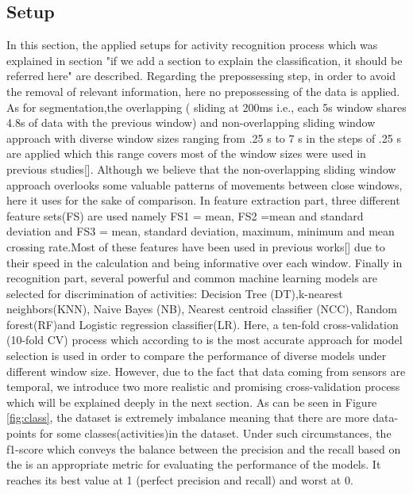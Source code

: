 \subsection{Setup}
In this section, the applied setups for activity recognition process which was explained in section {"if we add a section to explain the classification, it should be referred here"} are described. Regarding the prepossessing step, in order to avoid the removal of relevant information, here no prepossessing of the data is applied. As for segmentation,the overlapping (  sliding at 200ms i.e., each 5s window
shares 4.8s of data with the previous window) \cite{morris2014recofit} and non-overlapping \cite{banos2014window} sliding window approach with diverse window sizes ranging from .25 s to 7 s in the steps of .25 s are applied which this range covers most of the window sizes were used in previous studies[]. Although we believe that the non-overlapping sliding window approach overlooks some valuable patterns of movements between close windows, here it uses for the sake of comparison. 
In feature extraction part, three different feature sets(FS) are used namely FS1 = {mean}, FS2 ={mean and standard deviation} and FS3 = {mean, standard deviation, maximum, minimum and mean crossing rate}.Most of these features have been used in previous works[] due to their speed in the calculation and being informative over each window. Finally in recognition part, several powerful and common machine learning models are selected for discrimination of activities: Decision Tree (DT),k-nearest neighbors(KNN), Naive Bayes (NB), Nearest centroid classifier (NCC), Random forest(RF)and Logistic regression classifier(LR).\newline
Here, a ten-fold cross-validation (10-fold CV) process which according to \cite{arlot2010survey} is the most accurate approach for model selection is used in order to compare the performance of diverse models under different window size. However, due to the fact that data coming from sensors are temporal, we introduce two more realistic and promising cross-validation process which will be explained deeply in the next section.\newline
As can be seen in Figure \ref{fig:class}, the dataset is extremely imbalance meaning that there are more data-points for some classes(activities)in the dataset. Under such circumstances, the f1-score which conveys the balance between the precision and the recall based on the {} is an appropriate metric for evaluating the performance of the models. It reaches its best value at 1 (perfect precision and recall) and worst at 0.

